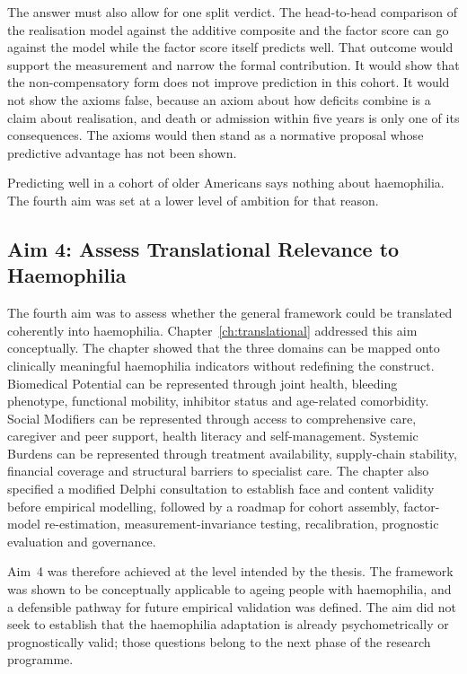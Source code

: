 The answer must also allow for one split verdict. The head-to-head comparison of
the realisation model against the additive composite and the factor score can go
against the model while the factor score itself predicts well. That outcome
would support the measurement and narrow the formal contribution. It would show
that the non-compensatory form does not improve prediction in this cohort. It
would not show the axioms false, because an axiom about how deficits combine is
a claim about realisation, and death or admission within five years is only one
of its consequences. The axioms would then stand as a normative proposal whose
predictive advantage has not been shown.

Predicting well in a cohort of older Americans says nothing about
haemophilia. The fourth aim was set at a lower level of ambition for that
reason.

\subsection{Aim 4: Assess Translational Relevance to Haemophilia}

The fourth aim was to assess whether the general framework could be translated coherently into haemophilia. Chapter~\ref{ch:translational} addressed this aim conceptually. The chapter showed that the three domains can be mapped onto clinically meaningful haemophilia indicators without redefining the construct. Biomedical Potential can be represented through joint health, bleeding phenotype, functional mobility, inhibitor status and age-related comorbidity. Social Modifiers can be represented through access to comprehensive care, caregiver and peer support, health literacy and self-management. Systemic Burdens can be represented through treatment availability, supply-chain stability, financial coverage and structural barriers to specialist care. The chapter also specified a modified Delphi consultation to establish face and content validity before empirical modelling, followed by a roadmap for cohort assembly, factor-model re-estimation, measurement-invariance testing, recalibration, prognostic evaluation and governance.

Aim~4 was therefore achieved at the level intended by the thesis. The framework was shown to be conceptually applicable to ageing people with haemophilia, and a defensible pathway for future empirical validation was defined. The aim did not seek to establish that the haemophilia adaptation is already psychometrically or prognostically valid; those questions belong to the next phase of the research programme.

